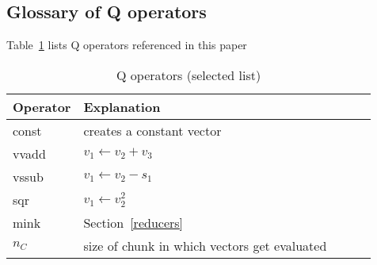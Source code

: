 \subsection{Glossary of Q operators}

Table~\ref{tbl_qops} lists Q operators referenced in this paper
\begin{table}
\centering
\begin{tabular}{|l|l|l|l|l|} \hline \hline
  {\bf Operator} & {\bf Explanation} \\ \hline \hline
  const & creates a constant vector \\ \hline
  vvadd & \(v_1 \leftarrow v_2 + v_3\) \\ \hline
  vssub & \(v_1 \leftarrow v_2 - s_1\) \\ \hline
  sqr & \(v_1 \leftarrow v_2^2\) \\ \hline
  mink & Section~\ref{reducers} \\ \hline
  \(n_C\) & size of chunk in which vectors get evaluated \\ \hline
  \hline
  \hline
\end{tabular}
\caption{Q operators (selected list)}
\label{tbl_qops}
\end{table}

